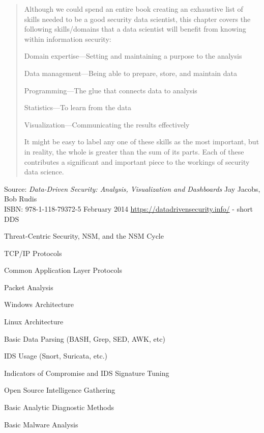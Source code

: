 \documentclass[Screen16to9,17pt]{foils}
\begin{document}
\begin{quote}
Although we could spend an entire book creating an exhaustive list of skills needed to be a good security data scientist, this chapter covers the following skills/domains that a data scientist will benefit from
knowing within information security:
\begin{list2}
\item Domain expertise—Setting and maintaining a purpose to the analysis
\item Data management—Being able to prepare, store, and maintain data
\item Programming—The glue that connects data to analysis
\item Statistics—To learn from the data
\item Visualization—Communicating the results effectively
\end{list2}
It might be easy to label any one of these skills as the most important, but in reality, the whole is greater than the sum of its parts. Each of these contributes a significant and important piece to the workings of
security data science.
\end{quote}

Source: \emph{Data-Driven Security: Analysis, Visualization and Dashboards} Jay Jacobs, Bob Rudis\\
ISBN: 978-1-118-79372-5 February 2014 \url{https://datadrivensecurity.info/} - short DDS




\begin{list2}\small
\item Threat-Centric Security, NSM, and the NSM Cycle
\item TCP/IP Protocols
\item Common Application Layer Protocols
\item Packet Analysis
\item Windows Architecture
\item Linux Architecture
\item Basic Data Parsing (BASH, Grep, SED, AWK, etc)
\item IDS Usage (Snort, Suricata, etc.)
\item Indicators of Compromise and IDS Signature Tuning
\item Open Source Intelligence Gathering
\item Basic Analytic Diagnostic Methods
\item Basic Malware Analysis
\end{list2}
\end{document}

